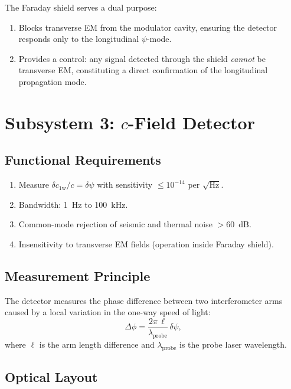 \documentclass[11pt,letterpaper]{article}
\newcommand{\cfield}{c_{\text{1w}}}
\newcommand{\cvac}{c}
\newcommand{\psifield}{\psi}
\begin{document}
The Faraday shield serves a dual purpose:
\begin{enumerate}
\item Blocks transverse EM from the modulator cavity, ensuring
the detector responds only to the longitudinal $\psifield$-mode.
\item Provides a control: any signal detected through the shield
\emph{cannot} be transverse EM, constituting a direct confirmation
of the longitudinal propagation mode.
\end{enumerate}

\section{Subsystem 3: $c$-Field Detector}
\label{sec:detector}

\subsection{Functional Requirements}

\begin{enumerate}[label=D\arabic*.]
\item Measure $\delta\cfield/\cvac = \delta\psifield$ with
sensitivity $\leq 10^{-14}$ per $\sqrt{\text{Hz}}$.
\item Bandwidth: 1~Hz to 100~kHz.
\item Common-mode rejection of seismic and thermal noise $>60$~dB.
\item Insensitivity to transverse EM fields (operation inside
Faraday shield).
\end{enumerate}

\subsection{Measurement Principle}

The detector measures the phase difference between two
interferometer arms caused by a local variation in the one-way
speed of light:
\begin{equation}
\Delta\phi = \frac{2\pi\,\ell}{\lambda_\text{probe}}\,
\delta\psifield,
\label{eq:phase_det}
\end{equation}
where $\ell$ is the arm length difference and
$\lambda_\text{probe}$ is the probe laser wavelength.

\subsection{Optical Layout}
\end{document}
